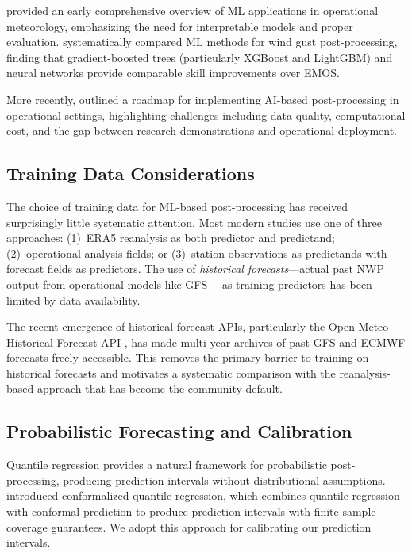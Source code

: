 \documentclass{ametsocV6.1}
\begin{document}
\citet{mcgovern2017using} provided an early comprehensive overview of ML
applications in operational meteorology, emphasizing the need for interpretable
models and proper evaluation. \citet{schulz2022machine} systematically compared
ML methods for wind gust post-processing, finding that gradient-boosted trees
(particularly XGBoost and LightGBM) and neural networks provide comparable
skill improvements over EMOS.

More recently, \citet{haupt2021first} outlined a roadmap for implementing AI-based
post-processing in operational settings, highlighting challenges including data
quality, computational cost, and the gap between research demonstrations and
operational deployment.

\subsection{Training Data Considerations}

The choice of training data for ML-based post-processing has received surprisingly
little systematic attention. Most modern studies use one of three approaches:
(1)~ERA5 reanalysis \citep{hersbach2020era5} as both predictor and predictand;
(2)~operational analysis fields; or (3)~station observations as predictands with
forecast fields as predictors. The use of \emph{historical forecasts}---actual past
NWP output from operational models like GFS \citep{ncep2021gfs}---as training
predictors has been limited by data availability.

The recent emergence of historical forecast APIs, particularly the Open-Meteo
Historical Forecast API \citep{zippenfenig2023openmeteo}, has made multi-year
archives of past GFS and ECMWF forecasts freely accessible. This removes the
primary barrier to training on historical forecasts and motivates a systematic
comparison with the reanalysis-based approach that has become the community default.

\subsection{Probabilistic Forecasting and Calibration}

Quantile regression \citep{koenker1978quantile} provides a natural framework for
probabilistic post-processing, producing prediction intervals without distributional
assumptions. \citet{romano2019conformal} introduced conformalized quantile
regression, which combines quantile regression with conformal prediction
\citep{romano2019conformal} to produce prediction intervals with finite-sample
coverage guarantees. We adopt this approach for calibrating our prediction intervals.
\end{document}
